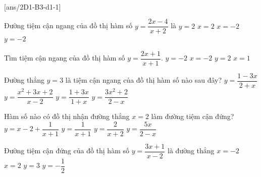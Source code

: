\baitaptn
{} \\
\setcounter{ex}{0}
[ans/2D1-B3-d1-1]
\begin{ex}
	Đường tiệm cận ngang của đồ thị hàm số $y=\dfrac{2x-4}{x+2}$ là
	\choice
	{\True $y=2$}
	{  $x=2$}
	{ $x=-2$}
	{$y=-2$}
	
\end{ex}

\begin{ex}
	Tìm tiệm cận ngang của đồ thị hàm số $ y = \dfrac{2x + 1}{ x +1} $.
	\choice
	{ \True $  y = -2 $}
	{$  x = -2 $}
	{ $  y = 2 $}
	{$ x = 1 $}
\end{ex}

\begin{ex}
	Đường thẳng $y=3$ là tiệm cận ngang của đồ thị hàm số nào sau đây?
	\choice
	{$y=\dfrac{1-3x}{2+x}$}
	{$y=\dfrac{x^2+3x+2}{x-2}$}
	{\True $y=\dfrac{1+3x}{1+x}$}
	{$y=\dfrac{3x^2+2}{2-x}$}
\end{ex}

\begin{ex}
	Hàm số nào có đồ thị nhận đường thẳng $x = 2$ làm đường tiệm cận đứng?
	\choice
	{$y=x-2+\dfrac{1}{x+1}$}
	{$y=\dfrac{1}{x+1}$}
	{$y=\dfrac{2}{x+2}$}
	{\True $y=\dfrac{5x}{2-x}$}
\end{ex}

\begin{ex}
	Đường tiệm cận đứng của đồ thị hàm số $y=\dfrac{3x+1}{x-2}$ là đường thẳng
	\choice
	{$x=-2$}
	{\True $x=2$}
	{$y=3$}
	{$y=-\dfrac{1}{2}$}
\end{ex}

